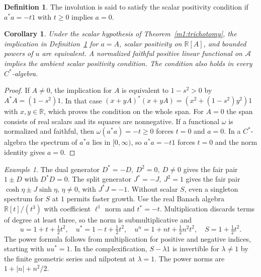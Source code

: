 \documentclass[11pt,reqno]{amsart}
\newtheorem{corollary}[theorem]{Corollary}
\theoremstyle{definition}
\newtheorem{definition}[theorem]{Definition}
\theoremstyle{remark}
\newtheorem{example}[theorem]{Example}
\numberwithin{equation}{section}
\begin{document}
\begin{definition}\label{m1:positivity}
The involution is said to satisfy the scalar positivity condition
if \(a^*a=-t1\) with \(t\ge0\) implies \(a=0\).
\end{definition}

\begin{corollary}\label{m1:positive-powers}
Under the scalar hypothesis of Theorem~\ref{m1:trichotomy},
the implication in Definition~\ref{m1:positivity} for \(a=A\),
scalar positivity on \(\mathbb R[A]\), and bounded powers of \(u\)
are equivalent. A normalized faithful positive linear functional
on \(\mathcal A\) implies the ambient scalar positivity condition.
The condition also holds in every \(C^*\)-algebra.
\end{corollary}
\begin{proof}
If \(A\ne0\), the implication for \(A\) is equivalent to
\(1-s^2>0\) by \(A^*A=(1-s^2)1\). In that case
\((x+yA)^*(x+yA)=(x^2+(1-s^2)y^2)1\) with \(x,y\in\mathbb R\),
which proves the condition on the whole span. For \(A=0\)
the span consists of real scalars and its squares are nonnegative.
If a functional \(\omega\) is normalized and faithful, then
\(\omega(a^*a)=-t\ge0\) forces \(t=0\) and \(a=0\).
In a \(C^*\)-algebra the spectrum of \(a^*a\) lies in
\([0,\infty)\), so \(a^*a=-t1\) forces \(t=0\) and the norm
identity gives \(a=0\).
\end{proof}

\begin{example}\label{m1:power-boundaries}
The dual generator \(D^*=-D,\ D^2=0,\ D\ne0\) gives the fair
pair \(1\pm D\) with \(D^*D=0\). The split generator
\(J^*=-J,\ J^2=1\) gives the fair pair \(\cosh\eta\pm J\sinh\eta\),
\(\eta\ne0\), with \(J^*J=-1\). Without scalar \(S\), even a
singleton spectrum for \(S\) at \(1\) permits faster growth.
Use the real Banach algebra \(\mathbb R[t]/(t^3)\) with coefficient
\(\ell^1\) norm and \(t^*=-t\). Multiplication discards terms of
degree at least three, so the norm is submultiplicative and
\[
 u=1+t+\tfrac12 t^2,\quad u^*=1-t+\tfrac12t^2,\quad
 u^n=1+nt+\tfrac12 n^2t^2,\quad S=1+\tfrac12t^2.
\]
The power formula follows from multiplication for positive and
negative indices, starting with \(uu^*=1\). In the complexification,
\(S-\lambda1\) is invertible for \(\lambda\ne1\) by the finite
geometric series and nilpotent at \(\lambda=1\). The power norms are
\(1+|n|+n^2/2\).
\end{example}
\end{document}
